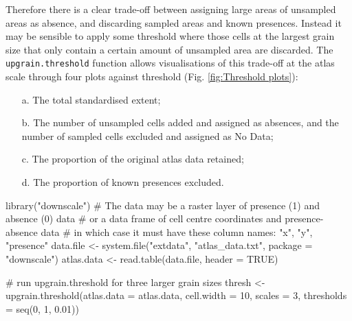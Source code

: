 \documentclass{article}[12pt, a4paper]
\begin{document}
Therefore there is a clear trade-off between assigning large areas of unsampled areas as absence, and discarding sampled areas and known presences. Instead it may be sensible to apply some threshold where those cells at the largest grain size that only contain a certain amount of unsampled area are discarded. The \texttt{upgrain.threshold} function allows visualisations of this trade-off at the atlas scale through four plots against threshold (Fig. \ref{fig:Threshold plots}):

\begin{enumerate} \itemsep1pt \parskip0pt 
\item [a.] The total standardised extent;
\item [b.] The number of unsampled cells added and assigned as absences, and the number of sampled cells excluded and assigned as No Data;
\item [c.] The proportion of the original atlas data retained;
\item [d.] The proportion of known presences excluded.
\end{enumerate}

\begin{Schunk}
\begin{Sinput}
library("downscale")
#  The data may be a raster layer of presence (1) and absence (0) data 
#  or a data frame of cell centre coordinates and presence-absence data 
#  in which case it must have these column names: "x", "y", "presence"
data.file <- system.file("extdata", "atlas_data.txt", package = "downscale")
atlas.data <- read.table(data.file, header = TRUE)

# run upgrain.threshold for three larger grain sizes
thresh <- upgrain.threshold(atlas.data = atlas.data,
                            cell.width = 10,
                            scales = 3,
                            thresholds = seq(0, 1, 0.01))
\end{Sinput}
\end{Schunk}
                            
\end{document}
